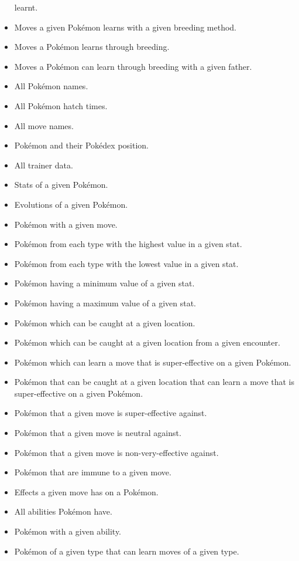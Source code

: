 \documentclass{article}
\begin{document}
\begin{itemize}
        learnt.
    \item Moves a given Pok\'emon learns with a given breeding method.
    \item Moves a Pok\'emon learns through breeding.
    \item Moves a Pok\'emon can learn through breeding with a given father.
    \item All Pok\'emon names.
    \item All Pok\'emon hatch times.
    \item All move names.
    \item Pok\'emon and their Pok\'edex position.
    \item All trainer data.
    \item Stats of a given Pok\'emon.
    \item Evolutions of a given Pok\'emon.
    \item Pok\'emon with a given move.
    \item Pok\'emon from each type with the highest value in a given stat.
    \item Pok\'emon from each type with the lowest value in a given stat.
    \item Pok\'emon having a minimum value of a given stat.
    \item Pok\'emon having a maximum value of a given stat.
    \item Pok\'emon which can be caught at a given location.
    \item Pok\'emon which can be caught at a given location from a given encounter.
    \item Pok\'emon which can learn a move that is super-effective on a given Pok\'emon.
    \item Pok\'emon that can be caught at a given location that can learn a move that is 
        super-effective on a given Pok\'emon.
    \item Pok\'emon that a given move is super-effective against.
    \item Pok\'emon that a given move is neutral against.
    \item Pok\'emon that a given move is non-very-effective against.
    \item Pok\'emon that are immune to a given move.
    \item Effects a given move has on a Pok\'emon.
    \item All abilities Pok\'emon have.
    \item Pok\'emon with a given ability.
    \item Pok\'emon of a given type that can learn moves of a given type.

\end{itemize}
\end{document}
